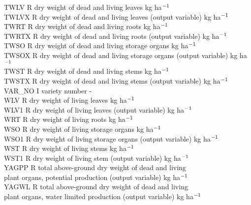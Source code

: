 \begin{tabbing}
TWLV\> \> R\> dry weight of dead and living leaves\> \> \> \> \> \> \> kg ha$^{{\rm -1}}$\\
TWLVX\> \> R\> dry weight of dead and living leaves (output variable)\> \> \> \> \> \> \> kg ha$^{{\rm -1}}$\\
TWRT\> \> R\> dry weight of dead and living roots \> \> \> \> \> \> \> kg ha$^{{\rm -1}}$\\
TWRTX\> \> R\> dry weight of dead and living roots (output variable)\> \> \> \> \> \> \> kg ha$^{{\rm -1}}$\\
TWSO\> \> R\> dry weight of dead and living storage organs\> \> \> \> \> \> \> kg ha$^{{\rm -1}}$\\
TWSOX\> \> R\> dry weight of dead and living storage organs (output variable)\> \> \> \> \> \> \> kg ha$^{{\rm -1}}$\\
TWST\> \> R\> dry weight of dead and living stems \> \> \> \> \> \> \> kg ha$^{{\rm -1}}$\\
TWSTX\> \> R\> dry weight of dead and living stems (output variable)\> \> \> \> \> \> \> kg ha$^{{\rm -1}}$\\
VAR\_NO\> \> I\> variety number\> \> \> \> \> \> \> -\\
WLV\> \> R\> dry weight of living leaves\> \> \> \> \> \> \> kg ha$^{{\rm -1}}$\\
WLV1\> \> R\> dry weight of living leaves (output variable)\> \> \> \> \> \> \> kg ha$^{{\rm -1}}$\\
WRT     \> \> R   \> dry weight of living roots                         \> \> \> \> \> \> \> kg ha$^{{\rm -1}}$\\
WSO     \> \> R   \> dry weight of living storage organs                \> \> \> \> \> \> \> kg ha$^{{\rm -1}}$\\
WSO1\> \> R\> dry weight of living storage organs (output variable)\> \> \> \> \> \> \> kg ha$^{{\rm -1}}$\\
WST\> \> R   \> dry weight of living stems              \> \> \> \> \> \> \> kg ha$^{{\rm -1}}$\\
WST1\> \> R\> dry weight of living stem (output variable)\> \> \> \> \> \> \> kg ha$^{{\rm -1}}$\\
YAGPP\> \> R\> total above-ground dry weight of dead and living\\
\>\> \> plant organs, potential production (output variable)\> \> \> \> \> \> \> kg ha$^{{\rm -1}}$\\
YAGWL\> \> R\> total above-ground dry weight of dead and living\\
\>\> \> plant organs, water limited production (output variable)\> \> \> \> \> \> \> kg ha$^{{\rm -1}}$\\

\end{tabbing}
